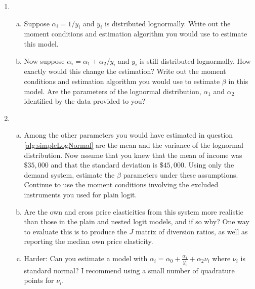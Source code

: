 \documentclass[12pt]{article}
\newcounter{mycounter} %
\begin{document}
\begin{enumerate}
\setcounter{enumi}{\value{mycounter}}
\item
    \begin{enumerate}[(a)]
    \item \label{alg:simpleLogNormal} Suppose $\alpha _{i}=1/y_{i}$ and $y_{i}$ is distributed
    lognormally. Write out the moment conditions and estimation
    algorithm you would use to estimate this model.

    \item Now suppose $\alpha_{i} = \alpha_{1} + \alpha_{2}/y_{i}$ and $y_i$ is still distributed lognormally. How exactly would this change the estimation? Write out the moment conditions and
    estimation algorithm you would use to estimate $\beta $ in this model.
    Are the parameters of the lognormal distribution, $\alpha
    _{1}$ and $\alpha _{2}$ identified by the data provided to you?
    \end{enumerate}

\item
    \begin{enumerate}[(a)]
    \item \label{est:blp} Among the other parameters you would have estimated in question \ref{alg:simpleLogNormal} are the mean and the variance of the lognormal distribution. Now
    assume that you knew that the mean of income was $\$35,000$ and that the
    standard deviation is $\$45,000$. Using only the demand system, estimate the
    $\beta $ parameters under these assumptions. Continue to use the moment conditions involving the excluded instruments you used for plain logit.
    \item Are the own and cross price
    elasticities from this system more realistic than those in the plain and nested logit models,
    and if so why? One way to evaluate this is to produce the $J$ matrix of diversion ratios, as well as reporting the median own price elasticity.
    \item Harder: Can you estimate a model with $\alpha_i = \alpha_0 + \frac{\alpha_1}{y_i}  + \alpha_2 \nu_i$ where $\nu_i$ is standard normal? I recommend using a small number of quadrature points for $\nu_i$. 
    \end{enumerate}
\end{enumerate}
\end{document}
